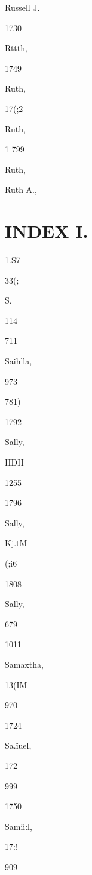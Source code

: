\documentclass{book}
\begin{document}
{{Russell J. 


1730 


Rttth, 


1749 


Ruth, 


17(;2 


Ruth, 


1 799 


Ruth, 




Ruth A., 



\chapter{INDEX I.}



1.S7 


33(; 




S. 




114 








711 




Saihlla, 


973 


781) 


1792 


Sally, 


HDH 


1255 


1796 


Sally, 


Kj.tM 


(;i6 


1808 


Sally, 


679 


1011 




Samaxtha, 


13(IM 


970 


1724 


Sa.\^iuel, 


172 


999 


1750 


Samii:l, 


17:! 


909 


}}
\end{document}
